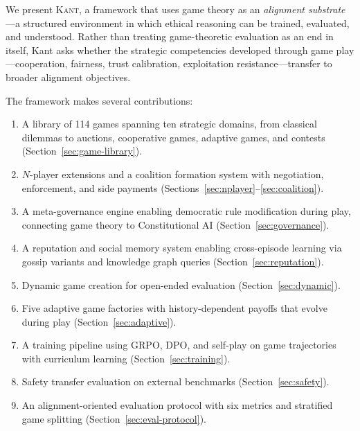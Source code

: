 We present \textsc{Kant}, a framework that uses game theory as an
\emph{alignment substrate}---a structured environment in which ethical
reasoning can be trained, evaluated, and understood. Rather than treating
game-theoretic evaluation as an end in itself, Kant asks whether the
strategic competencies developed through game play---cooperation, fairness,
trust calibration, exploitation resistance---transfer to broader alignment
objectives.

The framework makes several contributions:

\begin{enumerate}[nosep]
    \item A library of 114 games spanning ten strategic domains, from
          classical dilemmas to auctions, cooperative games, adaptive
          games, and contests (Section~\ref{sec:game-library}).
    \item $N$-player extensions and a coalition formation system with
          negotiation, enforcement, and side payments
          (Sections~\ref{sec:nplayer}--\ref{sec:coalition}).
    \item A meta-governance engine enabling democratic rule modification
          during play, connecting game theory to Constitutional AI
          (Section~\ref{sec:governance}).
    \item A reputation and social memory system enabling cross-episode
          learning via gossip variants and knowledge graph queries
          (Section~\ref{sec:reputation}).
    \item Dynamic game creation for open-ended evaluation
          (Section~\ref{sec:dynamic}).
    \item Five adaptive game factories with history-dependent payoffs
          that evolve during play (Section~\ref{sec:adaptive}).
    \item A training pipeline using GRPO, DPO, and self-play on game
          trajectories with curriculum learning
          (Section~\ref{sec:training}).
    \item Safety transfer evaluation on external benchmarks
          (Section~\ref{sec:safety}).
    \item An alignment-oriented evaluation protocol with six metrics
          and stratified game splitting
          (Section~\ref{sec:eval-protocol}).
\end{enumerate}
